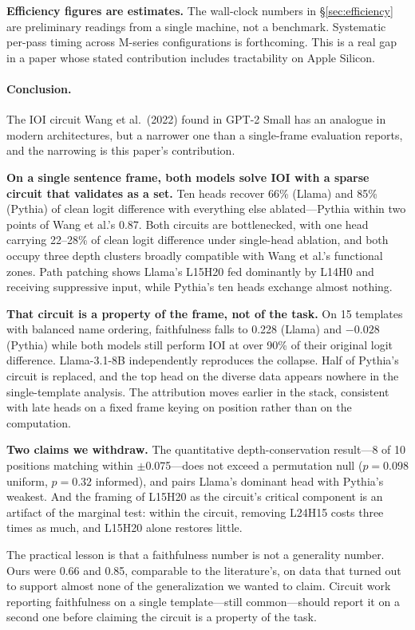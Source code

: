 \documentclass[11pt,a4paper]{article}
\begin{document}
\textbf{Efficiency figures are estimates.} The wall-clock numbers in
\S\ref{sec:efficiency} are preliminary readings from a single machine, not a
benchmark. Systematic per-pass timing across M-series configurations is forthcoming.
This is a real gap in a paper whose stated contribution includes tractability on
Apple Silicon.

\paragraph{Conclusion.}
The IOI circuit Wang et al.\ (2022) found in GPT-2 Small has an analogue in modern
architectures, but a narrower one than a single-frame evaluation reports, and the
narrowing is this paper's contribution.

\textbf{On a single sentence frame, both models solve IOI with a sparse circuit that
validates as a set.} Ten heads recover 66\% (Llama) and 85\% (Pythia) of clean logit
difference with everything else ablated---Pythia within two points of Wang et al.'s 0.87.
Both circuits are bottlenecked, with one head carrying 22--28\% of clean logit difference
under single-head ablation, and both occupy three depth clusters broadly compatible with
Wang et al.'s functional zones. Path patching shows Llama's L15H20 fed dominantly by
L14H0 and receiving suppressive input, while Pythia's ten heads exchange almost nothing.

\textbf{That circuit is a property of the frame, not of the task.} On 15 templates with
balanced name ordering, faithfulness falls to 0.228 (Llama) and $-0.028$ (Pythia) while
both models still perform IOI at over 90\% of their original logit difference.
Llama-3.1-8B independently reproduces the collapse. Half of Pythia's circuit is replaced,
and the top head on the diverse data appears nowhere in the single-template analysis. The
attribution moves earlier in the stack, consistent with late heads on a fixed frame
keying on position rather than on the computation.

\textbf{Two claims we withdraw.} The quantitative depth-conservation result---8 of 10
positions matching within $\pm$0.075---does not exceed a permutation null ($p = 0.098$
uniform, $p = 0.32$ informed), and pairs Llama's dominant head with Pythia's weakest. And
the framing of L15H20 as the circuit's critical component is an artifact of the marginal
test: within the circuit, removing L24H15 costs three times as much, and L15H20 alone
restores little.

The practical lesson is that a faithfulness number is not a generality number. Ours were
0.66 and 0.85, comparable to the literature's, on data that turned out to support almost
none of the generalization we wanted to claim. Circuit work reporting faithfulness on a
single template---still common---should report it on a second one before claiming the
circuit is a property of the task.
\end{document}
